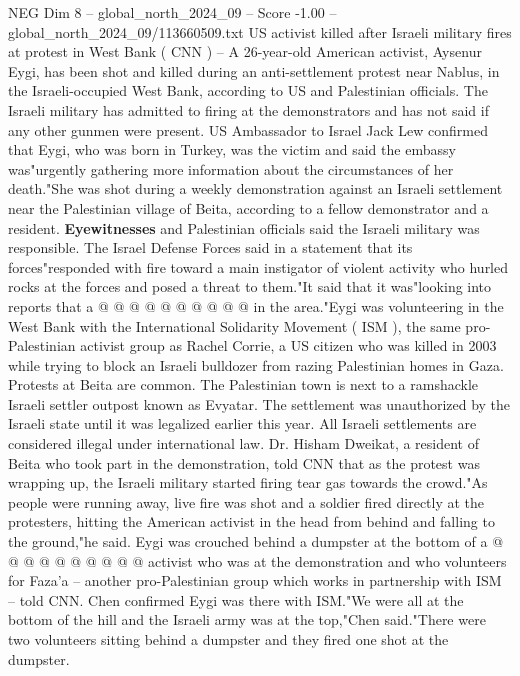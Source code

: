 \begin{textsample}{NEG Dim 8 – global\_north\_2024\_09 – Score -1.00 – global\_north\_2024\_09/113660509.txt}  \label{ex:f8_neg_375}
US activist killed after Israeli military fires at protest in West Bank ( CNN ) -- A 26-year-old American activist, Aysenur Eygi, has been shot and killed during an anti-settlement protest near Nablus, in the Israeli-occupied West Bank, according to US and Palestinian officials.
The Israeli military has admitted to firing at the demonstrators and has not said if any other gunmen were present.
US Ambassador to Israel Jack Lew confirmed that Eygi, who was born in Turkey, was the victim and said the embassy was"urgently gathering more information about the circumstances of her death."She was shot during a weekly demonstration against an Israeli settlement near the Palestinian village of Beita, according to a fellow demonstrator and a resident. \textbf{Eyewitnesses} and Palestinian officials said the Israeli military was responsible.
The Israel Defense Forces said in a statement that its forces"responded with fire toward a main instigator of violent activity who hurled rocks at the forces and posed a threat to them."It said that it was"looking into reports that a @ @ @ @ @ @ @ @ @ @ in the area."Eygi was volunteering in the West Bank with the International Solidarity Movement ( ISM ), the same pro-Palestinian activist group as Rachel Corrie, a US citizen who was killed in 2003 while trying to block an Israeli bulldozer from razing Palestinian homes in Gaza.
Protests at Beita are common.
The Palestinian town is next to a ramshackle Israeli settler outpost known as Evyatar.
The settlement was unauthorized by the Israeli state until it was legalized earlier this year.
All Israeli settlements are considered illegal under international law.
Dr.
Hisham Dweikat, a resident of Beita who took part in the demonstration, told CNN that as the protest was wrapping up, the Israeli military started firing tear gas towards the crowd."As people were running away, live fire was shot and a soldier fired directly at the protesters, hitting the American activist in the head from behind and falling to the ground,"he said.
Eygi was crouched behind a dumpster at the bottom of a @ @ @ @ @ @ @ @ @ @ activist who was at the demonstration and who volunteers for Faza'a -- another pro-Palestinian group which works in partnership with ISM -- told CNN.
Chen confirmed Eygi was there with ISM."We were all at the bottom of the hill and the Israeli army was at the top,"Chen said."There were two volunteers sitting behind a dumpster and they fired one shot at the dumpster.

\end{textsample}
